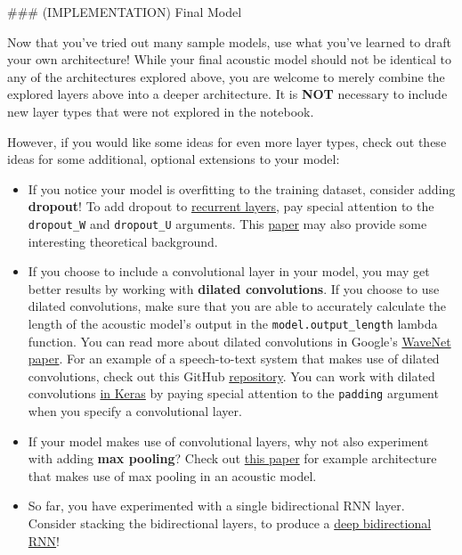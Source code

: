 \documentclass[11pt]{article}
\providecommand{\tightlist}{%
      \setlength{\itemsep}{0pt}\setlength{\parskip}{0pt}}
\begin{document}
     \#\#\# (IMPLEMENTATION) Final Model

Now that you've tried out many sample models, use what you've learned to
draft your own architecture! While your final acoustic model should not
be identical to any of the architectures explored above, you are welcome
to merely combine the explored layers above into a deeper architecture.
It is \textbf{NOT} necessary to include new layer types that were not
explored in the notebook.

However, if you would like some ideas for even more layer types, check
out these ideas for some additional, optional extensions to your model:

\begin{itemize}
\tightlist
\item
  If you notice your model is overfitting to the training dataset,
  consider adding \textbf{dropout}! To add dropout to
  \href{https://faroit.github.io/keras-docs/1.0.2/layers/recurrent/}{recurrent
  layers}, pay special attention to the \texttt{dropout\_W} and
  \texttt{dropout\_U} arguments. This
  \href{http://arxiv.org/abs/1512.05287}{paper} may also provide some
  interesting theoretical background.
\item
  If you choose to include a convolutional layer in your model, you may
  get better results by working with \textbf{dilated convolutions}. If
  you choose to use dilated convolutions, make sure that you are able to
  accurately calculate the length of the acoustic model's output in the
  \texttt{model.output\_length} lambda function. You can read more about
  dilated convolutions in Google's
  \href{https://arxiv.org/abs/1609.03499}{WaveNet paper}. For an example
  of a speech-to-text system that makes use of dilated convolutions,
  check out this GitHub
  \href{https://github.com/buriburisuri/speech-to-text-wavenet}{repository}.
  You can work with dilated convolutions
  \href{https://keras.io/layers/convolutional/}{in Keras} by paying
  special attention to the \texttt{padding} argument when you specify a
  convolutional layer.
\item
  If your model makes use of convolutional layers, why not also
  experiment with adding \textbf{max pooling}? Check out
  \href{https://arxiv.org/pdf/1701.02720.pdf}{this paper} for example
  architecture that makes use of max pooling in an acoustic model.
\item
  So far, you have experimented with a single bidirectional RNN layer.
  Consider stacking the bidirectional layers, to produce a
  \href{https://www.cs.toronto.edu/~graves/asru_2013.pdf}{deep
  bidirectional RNN}!
\end{itemize}
\end{document}
